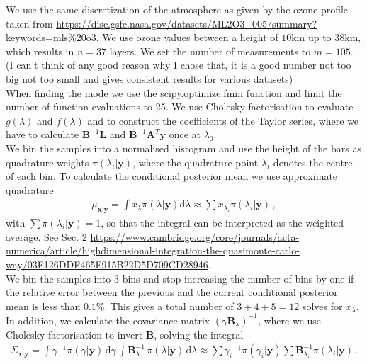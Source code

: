 We use the same discretization of the atmosphere as given by the ozone profile taken from \url{https://disc.gsfc.nasa.gov/datasets/ML2O3_005/summary?keywords=mls%20o3}.
We use ozone values between a height of $10$km up to $38$km, which results in $n=37$ layers.
We set the number of measurements to $m= 105 $.
(I can't think of any good reason why I chose that, it is a good number not too big not too small and gives consistent results for various datasets)\\

When finding the mode we use the scipy.optimize.fmin function and limit the number of function evaluations to 25.
We use Cholesky factorisation to evaluate $g(\lambda)$ and $f(\lambda)$ and to construct the coefficients of the Taylor series, where we have to calculate  $\bm{B}^{-1} \bm{L} $ and  $\bm{B}^{-1}  \bm{A}^T \bm{y}$ once at $\lambda_0$.\\


We bin the samples into a normalised histogram and use the height of the bars as quadrature weights $\pi(\lambda_i| \bm{y})$, where the quadrature point $\lambda_i$ denotes the centre of each bin.
To calculate the conditional posterior mean we use approximate quadrature
\begin{align}
	\mu_{\bm{x}|\bm{y}} = \int x_{\lambda} \pi(\lambda| \bm{y}) \text{d}\lambda \approx \sum x_{\lambda_i} \pi(\lambda_i| \bm{y}) \, ,
\end{align}
with $\sum \pi(\lambda_i| \bm{y}) = 1$, so that the integral can be interpreted as the weighted average.
See Sec. 2 \url{https://www.cambridge.org/core/journals/acta-numerica/article/highdimensional-integration-the-quasimonte-carlo-way/03F126DDF465F915B22D5D709CD28946}.\\

We bin the samples into $3$ bins and stop increasing the number of bins by one if the relative error between the previous and the current conditional posterior mean is less than $0.1\%$.
This gives a total number of $3+4+5 = 12$ solves for $x_{\lambda}$.
In addition, we calculate the covariance matrix $(\gamma \bm{B}_{\lambda})^{-1} $, where we use Cholesky factorisation to invert $\bm{B}$, solving the integral
\begin{align}
	\Sigma_{\bm{x}|\bm{y}} = \int \gamma^{-1}  \pi(\gamma | \bm{y} ) \, \text{d} \gamma \, \int  \bm{B}_{\lambda}^{-1} \, \pi(\lambda | \bm{y} )  \, \text{d} \lambda  \approx \sum {\gamma_i}^{-1}\pi(\gamma_i| \bm{y}) \sum \bm{B}_{\lambda_i}^{-1}\pi(\lambda_i| \bm{y})\, .
\end{align}\\

